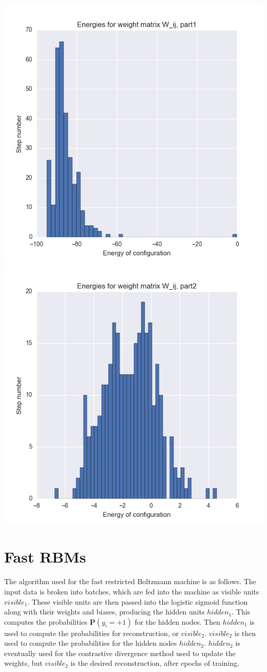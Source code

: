 \documentclass[11pt]{amsart}
\theoremstyle{remark}
\theoremstyle{remark}
\numberwithin{equation}{section}
\newcommand{\Prob}{\mathbf{P}}
\begin{document}
	\graphicspath{ {../Images/genericBM/} }
\begin{center}
 \includegraphics[width=.5\textwidth]{energies1.png}\hfill
  \includegraphics[width=.5\textwidth]{energies2.png}
\end{center}


\section{Fast RBMs}

	The algorithm used for the fast restricted Boltzmann machine is as follows. 
	The input data is broken into batches, which are fed into the machine as 
	visible units $visible_1$. These visible units are then passed into the logistic 
	sigmoid function along with their weights and biases, producing the hidden 
	units $hidden_1$. This computes the probabilities $\Prob(y_i = +1)$ for 
	the hidden nodes. Then $hidden_1$ is used to compute the probabilities for 
	reconstruction, or $visible_2$. $visible_2$ is then used to compute the
	probabilities for the hidden nodes $hidden_2$. $hidden_2$ is eventually 
	used for the contrastive divergence method used to update the weights, 
	but $visible_2$ is the desired reconstruction, after epochs 
	of training.
	
\end{document}
